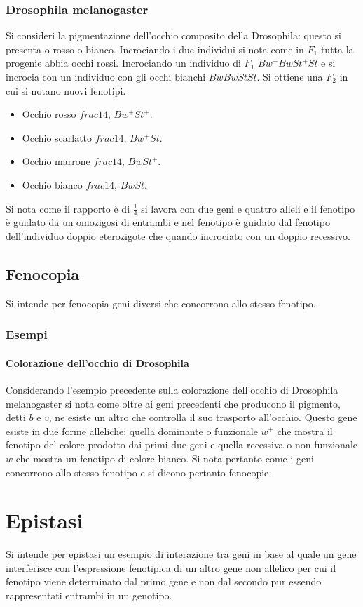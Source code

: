 \subsubsection{Drosophila melanogaster}
Si consideri la pigmentazione dell'occhio composito della Drosophila: questo si presenta o rosso o bianco. Incrociando i due individui si nota come in $F_1$ tutta la progenie abbia
occhi rossi. Incrociando un individuo di $F_1$ $Bw^+BwSt^+St$ e si incrocia con un individuo con gli occhi bianchi $BwBwStSt$. Si ottiene una $F_2$ in cui si notano nuovi fenotipi. 
\begin{itemize}
	\item Occhio rosso $frac{1}{4}$, $Bw^+St^+$.
	\item Occhio scarlatto $frac{1}{4}$, $Bw^+St$.
	\item Occhio marrone $frac{1}{4}$, $BwSt^+$.
	\item Occhio bianco $frac{1}{4}$, $BwSt$.
\end{itemize}
Si nota come il rapporto \`e di $\frac{1}{4}$ si lavora con due geni e quattro alleli e il fenotipo \`e guidato da un omozigosi di entrambi e nel fenotipo \`e guidato dal fenotipo 
dell'individuo doppio eterozigote che quando incrociato con un doppio recessivo. 
\subsection{Fenocopia}
Si intende per fenocopia geni diversi che concorrono allo stesso fenotipo.
\subsubsection{Esempi}
\paragraph{Colorazione dell'occhio di Drosophila}
Considerando l'esempio precedente sulla colorazione dell'occhio di Drosophila melanogaster si nota come oltre ai geni precedenti che producono il pigmento, detti $b$ e $v$, ne esiste
un altro che controlla il suo trasporto all'occhio. Questo gene esiste in due forme alleliche: quella dominante o funzionale $w^+$ che mostra il fenotipo del colore prodotto dai primi
due geni e quella recessiva o non funzionale $w$ che mostra un fenotipo di colore bianco. Si nota pertanto come i geni concorrono allo stesso fenotipo e si dicono pertanto fenocopie. 
\section{Epistasi}
Si intende per epistasi un esempio di interazione tra geni in base al quale un gene interferisce con l'espressione fenotipica di un altro gene non allelico per cui il fenotipo 
viene determinato dal primo gene e non dal secondo pur essendo rappresentati entrambi in un genotipo. 



